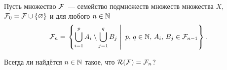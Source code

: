 \begin{task}{5}
    Пусть множество $\mathcal{F} $~--- семейство подмножеств множеств множества $X$, $\mathcal{F} _0=\mathcal{F} \cup\{\varnothing\}$ и для любого
    $n\in\mathbb{N}$
    \[
        \mathcal{F} _n=\left.\left\{\bigcup_{i=1}^{p}A_i\setminus\bigcup_{j=1}^q B_j\ \right\vert \ p,\, q\in\mathbb{N},\, A_i,\, B_j\in\mathcal{F} _{n-1}\right\}.
    \]

    Всегда ли найдётся $n\in \mathbb{N}$ такое, что $\mathcal{R} (\mathcal{F} )=\mathcal{F} _n$?
\end{task}